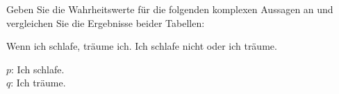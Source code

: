 \begin{frame}

Geben Sie die Wahrheitswerte für die folgenden komplexen Aussagen an und vergleichen Sie die Ergebnisse beider Tabellen:

\ea\label{ex:Equi7} Wenn ich schlafe, träume ich.
\ex\label{ex:Equi8} Ich schlafe nicht oder ich träume.
\z 	

\pause

{\small 
	$p$: Ich schlafe.\\
	$q$: Ich träume.
}

\pause 

\begin{minipage}{0.48\textwidth}
	\centering
	
\end{minipage}
\pause
\begin{minipage}{0.48\textwidth}
	\centering
	
	
\end{minipage}

\end{frame}

